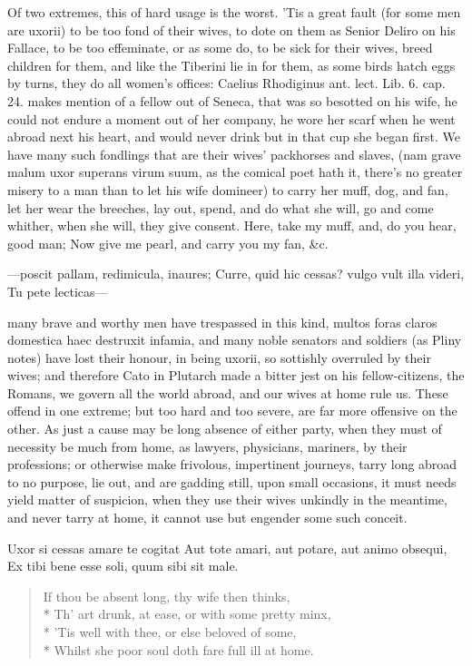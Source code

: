 {Of two extremes, this of hard usage is the worst. 'Tis a great fault
(for some men are uxorii) to be too fond of their wives, to dote on
them as Senior Deliro on his Fallace, to be too effeminate, or as
some do, to be sick for their wives, breed children for them, and like
the  Tiberini lie in for them, as some birds hatch eggs by turns,
they do all women's offices: Caelius Rhodiginus ant. lect. Lib. 6. cap.
24. makes mention of a fellow out of Seneca, that was so besotted
on his wife, he could not endure a moment out of her company, he wore
her scarf when he went abroad next his heart, and would never drink but
in that cup she began first. We have many such fondlings that are their
wives' packhorses and slaves, (nam grave malum uxor superans virum
suum, as the comical poet hath it, there's no greater misery to a man
than to let his wife domineer) to carry her muff, dog, and fan, let her
wear the breeches, lay out, spend, and do what she will, go and come
whither, when she will, they give consent.
Here, take my muff, and, do you hear, good man;
Now give me pearl, and carry you my fan, \&c.

---poscit pallam, redimicula, inaures;
Curre, quid hic cessas? vulgo vult illa videri,
Tu pete lecticas---

many brave and worthy men have trespassed in this kind, multos foras
claros domestica haec destruxit infamia, and many noble senators and
soldiers (as Pliny notes) have lost their honour, in being
uxorii, so sottishly overruled by their wives; and therefore Cato in
Plutarch made a bitter jest on his fellow-citizens, the Romans, we
govern all the world abroad, and our wives at home rule us. These
offend in one extreme; but too hard and too severe, are far more
offensive on the other. As just a cause may be long absence of either
party, when they must of necessity be much from home, as lawyers,
physicians, mariners, by their professions; or otherwise make
frivolous, impertinent journeys, tarry long abroad to no purpose, lie
out, and are gadding still, upon small occasions, it must needs yield
matter of suspicion, when they use their wives unkindly in the
meantime, and never tarry at home, it cannot use but engender some such
conceit.

Uxor si cessas amare te cogitat
Aut tote amari, aut potare, aut animo obsequi,
Ex tibi bene esse soli, quum sibi sit male.

\begin{verse}
If thou be absent long, thy wife then thinks,\\*
Th' art drunk, at ease, or with some pretty minx,\\*
'Tis well with thee, or else beloved of some,\\*
Whilst she poor soul doth fare full ill at home.
\end{verse}

}

